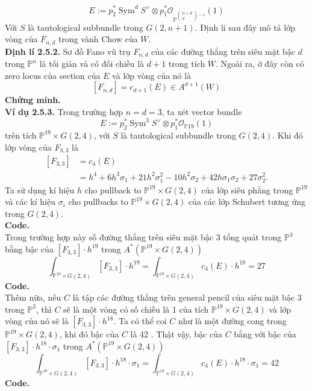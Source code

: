 \documentclass[11pt,a4paper]{book}
\begin{document}
$$E:=p_2^* \operatorname{Sym}^d S^{\vee} \otimes p_1^* \mathcal{O}_{\mathbb{P}^{\begin{pmatrix}
			n+d\\
			d
		\end{pmatrix}-1}}(1)$$
Với $S$ là tautological subbundle trong $G(2, n+1)$. Định lí sau đây mô tả lớp vòng của $F_{n, d}$ trong vành Chow của $W$.\\
\textbf{Định lí 2.5.2.} Sơ đồ Fano vũ trụ $F_{n, d}$ của các đường thẳng trên siêu mặt bậc $d$ trong $\mathbb{P}^n$ là tối giản và có đối chiều là $d+1$ trong tích $W$. Ngoài ra, ở đây còn có zero locus của section của $E$ và lớp vòng của nó là
$$\left[F_{n, d}\right]=c_{d+1}(E) \in A^{d+1}(W)$$
\textbf{Chứng minh.}\\
\textbf{Ví dụ 2.5.3.} Trong trường hợp $n=d=3$, ta xét vector bundle
$$
E:=p_2^* \operatorname{Sym}^3 S^{\vee} \otimes p_1^* \mathcal{O}_{\mathbb{P} 19}(1)
$$
trên tích $\mathbb{P}^{19} \times G(2,4)$, với $S$ là tautological subbundle trong $G(2,4)$. Khi đó lớp vòng của $F_{3,3}$ là
$$
\begin{aligned}
	{\left[F_{3,3}\right] } & =c_4(E) \\
	& =h^4+6 h^3 \sigma_1+21 h^2 \sigma_1^2-10 h^2 \sigma_2+42 h \sigma_1 \sigma_2+27 \sigma_2^2 .
\end{aligned}
$$
Ta sử dụng kí hiệu $h$ cho pullback to $\mathbb{P}^{19} \times G(2,4)$ của lớp siêu phẳng trong $\mathbb{P}^{19}$ và các kí hiệu $\sigma_i$ cho pullbacks to $\mathbb{P}^{19} \times G(2,4)$ của các lớp Schubert tương ứng trong $G(2,4)$.\\
\textbf{Code.}\\
Trong trường hợp này số đường thẳng trên siêu mặt bậc 3 tổng quát trong $\mathbb{P}^3$ bằng bậc của $\left[F_{3,3}\right] \cdot h^{19}$ trong $A^*\left(\mathbb{P}^{19} \times G(2,4)\right)$
$$\int_{\mathbb{P}^{19} \times G(2,4)}\left[F_{3,3}\right] \cdot h^{19}=\int_{\mathbb{P}^{19} \times G(2,4)} c_4(E) \cdot h^{19}=27 $$
\textbf{Code.}\\
Thêm nữa, nếu $C$ là tập các đường thẳng trên general pencil của siêu mặt bậc 3 trong $\mathbb{P}^3$, thì $C$ sẽ là một vòng có số chiều là 1 của tích $\mathbb{P}^{19} \times G(2,4)$ và lớp vòng của nó sẽ là $\left[F_{3,3}\right] \cdot h^{18}$. Ta có thể coi $C$ như là một đường cong trong $\mathbb{P}^{19} \times G(2,4)$, khi đó bậc của $C$ là 42 . Thật vậy, bậc của $C$ bằng với bậc của $\left[F_{3,3}\right] \cdot h^{18} \cdot \sigma_1$ trong $A^*\left(\mathbb{P}^{19} \times G(2,4)\right)$
$$\int_{\mathbb{P}^{19} \times G(2,4)}\left[F_{3,3}\right] \cdot h^{18} \cdot \sigma_1=\int_{\mathbb{P}^{19} \times G(2,4)} c_4(E) \cdot h^{18} \cdot \sigma_1=42 $$
\textbf{Code.}
\end{document}
